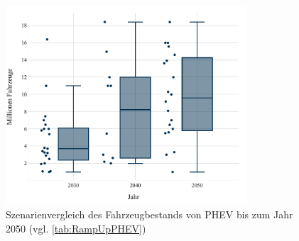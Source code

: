 \begin{figure}[H]
    \centering
    \includegraphics[width=0.8\textwidth]{Bilder/RampUp-PHEV-MA}
    \caption[Szenarienvergleich des Fahrzeugbestands von PHEV bis zum Jahr \num{2050}]{Szenarienvergleich des Fahrzeugbestands von PHEV bis zum Jahr \num{2050} (vgl. \autoref{tab:RampUpPHEV})}\label{fig:RampUpPHEV}
\end{figure}